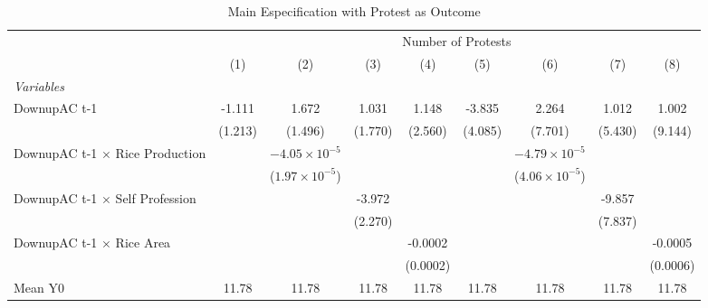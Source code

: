 
\begin{table}[htbp]
   \caption{\label{tab:protest_treat_main} Main Especification with Protest as Outcome}
   \centering
   \begin{tabular}{lcccccccc}
      \tabularnewline \midrule \midrule
       & \multicolumn{8}{c}{Number of Protests}\\
                                             & (1)           & (2)                     & (3)           & (4)           & (5)           & (6)                     & (7)           & (8)\\  
      \midrule
      \emph{Variables}\\
      DownupAC t-1                           & -1.111        & 1.672                   & 1.031         & 1.148         & -3.835        & 2.264                   & 1.012         & 1.002\\   
                                             & (1.213)       & (1.496)                 & (1.770)       & (2.560)       & (4.085)       & (7.701)                 & (5.430)       & (9.144)\\   
      DownupAC t-1 $\times$ Rice Production  &               & $-4.05\times 10^{-5}$   &               &               &               & $-4.79\times 10^{-5}$   &               &   \\   
                                             &               & ($1.97\times 10^{-5}$)  &               &               &               & ($4.06\times 10^{-5}$)  &               &   \\   
      DownupAC t-1 $\times$ Self Profession  &               &                         & -3.972        &               &               &                         & -9.857        &   \\   
                                             &               &                         & (2.270)       &               &               &                         & (7.837)       &   \\   
      DownupAC t-1 $\times$ Rice Area        &               &                         &               & -0.0002       &               &                         &               & -0.0005\\   
                                             &               &                         &               & (0.0002)      &               &                         &               & (0.0006)\\   
      Mean Y0                                & 11.78         & 11.78                   & 11.78         & 11.78         & 11.78         & 11.78                   & 11.78         & 11.78\\  

\end{tabular}
\end{table}
